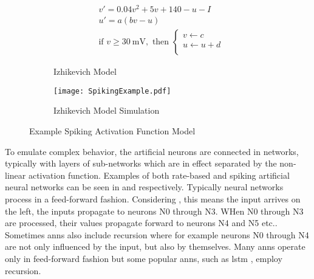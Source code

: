 \begin{figure}
\centering
\captionsetup{justification=centering}
\vspace{0.5cm}
\begin{subfigure}{.9\textwidth}
  \centering
  \begin{equation}
    \begin{split}
    &v' = 0.04v^2+5v + 140 - u - I\\
    &u' = a(bv-u)  \\
    &\text{if } v\ge  \SI{30}{\mV}, \text{ then } 
    \begin{cases}
        v \leftarrow c\\           
        u \leftarrow u+d\\           
    \end{cases} \nonumber
    \end{split}
  \end{equation}
  \caption{Izhikevich Model\cite{Iz2005}}
  \label{fig:Izhikevich Model}
  \end{subfigure}
\begin{subfigure}{.7\textwidth}
  \centering
  \mbox{\texttt{[image: SpikingExample.pdf]}}
  \captionsetup{justification=centering, skip=3pt}
  \caption{Izhikevich Model Simulation \cite{Iz2005}\cite{carnevale2006neuron}}
  \label{fig:spiking example}
\end{subfigure}
\caption{Example Spiking Activation Function Model}
\label{fig:Example Spiking Model}
\end{figure}

To emulate complex behavior, the artificial neurons are connected in networks, typically with layers of sub-networks which are in effect separated by the non-linear activation function.
Examples of both rate-based and spiking artificial neural networks can be seen in  and  respectively.
Typically neural networks process in a feed-forward fashion. Considering , this means the input arrives on the left, the inputs propagate to neurons N0 through N3. WHen N0 through N3 are processed, their values propagate forward to neurons N4 and N5 etc.. Sometimes \ac{ann}s also include recursion where for example neurons N0 through N4 are not only influenced
by the input, but also by themselves. Many \ac{ann}s operate only in feed-forward fashion but some popular \ac{ann}s, such as \ac{lstm} \cite{hochreiter1997long}, employ recursion.

